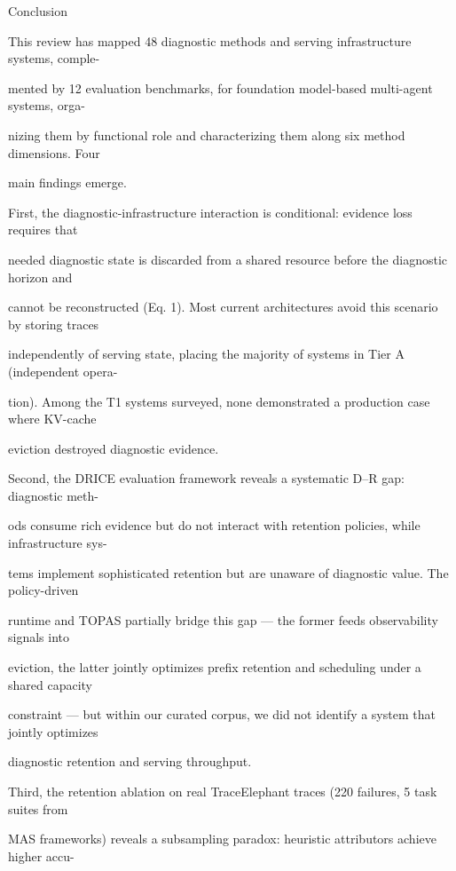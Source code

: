 \begin{flushleft}
 Conclusion\par
\noindent This review has mapped 48 diagnostic methods and serving infrastructure systems, comple-\par
\noindent mented by 12 evaluation benchmarks, for foundation model-based multi-agent systems, orga-\par
\noindent nizing them by functional role and characterizing them along six method dimensions. Four\par
\noindent main findings emerge.\par
\noindent  First, the diagnostic-infrastructure interaction is conditional: evidence loss requires that\par
\noindent needed diagnostic state is discarded from a shared resource before the diagnostic horizon and\par
\noindent cannot be reconstructed (Eq. 1). Most current architectures avoid this scenario by storing traces\par
\noindent independently of serving state, placing the majority of systems in Tier A (independent opera-\par
\noindent tion). Among the T1 systems surveyed, none demonstrated a production case where KV-cache\par
\noindent eviction destroyed diagnostic evidence.\par
\noindent  Second, the DRICE evaluation framework reveals a systematic D–R gap: diagnostic meth-\par
\noindent ods consume rich evidence but do not interact with retention policies, while infrastructure sys-\par
\noindent tems implement sophisticated retention but are unaware of diagnostic value. The policy-driven\par
\noindent runtime and TOPAS partially bridge this gap — the former feeds observability signals into\par
\noindent eviction, the latter jointly optimizes prefix retention and scheduling under a shared capacity\par
\noindent constraint — but within our curated corpus, we did not identify a system that jointly optimizes\par
\noindent diagnostic retention and serving throughput.\par
\noindent  Third, the retention ablation on real TraceElephant traces (220 failures, 5 task suites from\par
{} MAS frameworks) reveals a subsampling paradox: heuristic attributors achieve higher accu-\par

\end{flushleft}
